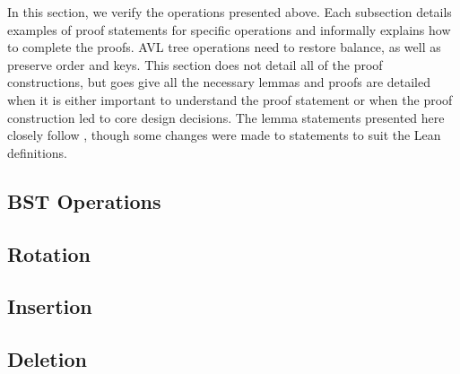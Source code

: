 In this section, we verify the operations presented above. Each subsection details examples of proof statements for specific operations and informally explains how to complete the proofs. AVL tree operations need to restore balance, as well as preserve order and keys. This section does not detail all of the proof constructions, but goes give all the necessary lemmas and proofs are detailed when it is either important to understand the proof statement or when the proof construction led to core design decisions. The lemma statements presented here closely follow \cite{textbook:discrete_computer}, though some changes were made to statements to suit the Lean definitions.

\subsection{BST Operations}


\subsection{Rotation}


\subsection{Insertion}


\subsection{Deletion}
